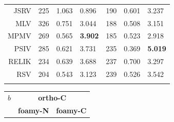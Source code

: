 \documentclass[12pt]{article}
\newcommand{\3}{$3_{10}$}
\begin{document}
\begin{table}
\begin{tabular}{r|lll|lll|}
JSRV   &  225  & 1.063 &      0.896  &  190  & 0.601 &      3.237  \\
MLV    &  326  & 0.751 &      3.044  &  188  & 0.508 &      3.151  \\
MPMV   &  269  & 0.565 & {\bf 3.902} &  185  & 0.523 &      2.918  \\
PSIV   &  285  & 0.621 &      3.731  &  235  & 0.369 & {\bf 5.019} \\
RELIK  &  234  & 0.639 &      3.688  &  237  & 0.700 &      3.297  \\
RSV    &  204  & 0.543 &      3.123  &  239  & 0.526 &      3.542  \\
\hline \hline
\vspace{10pt}
\end{tabular}
\begin{tabular}{r|lll|lll|}
$b$  & \multicolumn{6}{c|}{\bf ortho-C} \\
     & \multicolumn{3}{c|}{\bf foamy-N} & \multicolumn{3}{c|}{\bf foamy-C}  \\

\end{tabular}
\end{table}
\end{document}
